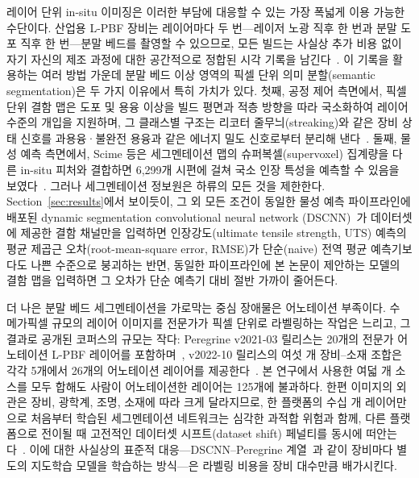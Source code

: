 레이어 단위 in-situ 이미징은 이러한 부담에 대응할 수 있는 가장 폭넓게 이용
가능한 수단이다. 산업용 L-PBF 장비는 레이어마다 두 번---레이저 노광 직후 한
번과 분말 도포 직후 한 번---분말 베드를 촬영할 수 있으므로, 모든 빌드는
사실상 추가 비용 없이 자기 자신의 제조 과정에 대한 공간적으로 정합된 시각
기록을 남긴다~\cite{Scime2018Anomaly,Gobert2018InProcess,DebRoy2021NatRevMater,Mahmoud2021LPBFreview}.
이 기록을 활용하는 여러 방법 가운데 분말 베드 이상 영역의 픽셀 단위 의미
분할(semantic segmentation)은 두 가지 이유에서 특히 가치가 있다. 첫째, 공정
제어 측면에서, 픽셀 단위 결함 맵은 도포 및 용융 이상을 빌드 평면과 적층
방향을 따라 국소화하여 레이어 수준의 개입을 지원하며, 그 클래스별 구조는
리코터 줄무늬(streaking)와 같은 장비 상태 신호를 과용융·불완전 용융과 같은
에너지 밀도 신호로부터 분리해 낸다~\cite{Scime2020DSCNN}. 둘째, 물성 예측
측면에서, Scime 등은 세그멘테이션 맵의 슈퍼복셀(supervoxel) 집계량을 다른
in-situ 피처와 결합하면 6{,}299개 시편에 걸쳐 국소 인장 특성을 예측할 수
있음을 보였다~\cite{VPPM_Baseline,ORNL_CoRegistered_Dataset}. 그러나
세그멘테이션 정보원은 하류의 모든 것을 제한한다.
Section~\ref{sec:results}에서 보이듯이, 그 외 모든 조건이 동일한 물성 예측
파이프라인에 배포된 dynamic segmentation convolutional neural network
(DSCNN)~\cite{Scime2020DSCNN}가 데이터셋에 제공한 결함 채널만을 입력하면
인장강도(ultimate tensile strength, UTS) 예측의 평균 제곱근
오차(root-mean-square error, RMSE)가 단순(naive) 전역 평균 예측기보다도 나쁜
수준으로 붕괴하는 반면, 동일한 파이프라인에 본 논문이 제안하는 모델의 결함
맵을 입력하면 그 오차가 단순 예측기 대비 절반 가까이 줄어든다.

더 나은 분말 베드 세그멘테이션을 가로막는 중심 장애물은 어노테이션 부족이다.
수 메가픽셀 규모의 레이어 이미지를 전문가가 픽셀 단위로 라벨링하는 작업은
느리고, 그 결과로 공개된 코퍼스의 규모는 작다: Peregrine v2021-03 릴리스는
20개의 전문가 어노테이션 L-PBF 레이어를 포함하며~\cite{Peregrine_v2021_03},
v2022-10 릴리스의 여섯 개 장비--소재 조합은 각각 5개에서 26개의 어노테이션
레이어를 제공한다~\cite{Peregrine_v2022_10}. 본 연구에서 사용한 여덟 개
소스를 모두 합해도 사람이 어노테이션한 레이어는 125개에 불과하다. 한편
이미지의 외관은 장비, 광학계, 조명, 소재에 따라 크게 달라지므로, 한 플랫폼의
수십 개 레이어만으로 처음부터 학습된 세그멘테이션 네트워크는 심각한 과적합
위험과 함께, 다른 플랫폼으로 전이될 때 고전적인 데이터셋 시프트(dataset
shift) 페널티를 동시에 떠안는다~\cite{Quinonero2009DatasetShift,Torralba2011DatasetBias,Pan2010TransferLearning}.
이에 대한 사실상의 표준적 대응---DSCNN--Peregrine
계열~\cite{Scime2020DSCNN}과 같이 장비마다 별도의 지도학습 모델을 학습하는
방식---은 라벨링 비용을 장비 대수만큼 배가시킨다.

